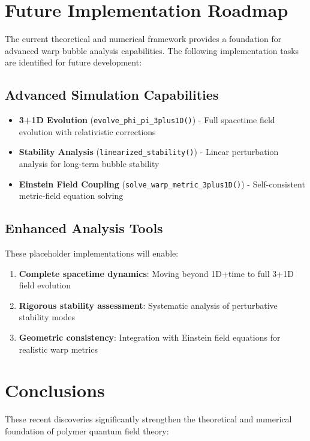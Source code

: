 \documentclass[11pt]{article}
\begin{document}
\section{Future Implementation Roadmap}

The current theoretical and numerical framework provides a foundation for advanced warp bubble analysis capabilities. The following implementation tasks are identified for future development:

\subsection{Advanced Simulation Capabilities}
\begin{itemize}
\item \textbf{3+1D Evolution} (\texttt{evolve\_phi\_pi\_3plus1D()}) - Full spacetime field evolution with relativistic corrections
\item \textbf{Stability Analysis} (\texttt{linearized\_stability()}) - Linear perturbation analysis for long-term bubble stability
\item \textbf{Einstein Field Coupling} (\texttt{solve\_warp\_metric\_3plus1D()}) - Self-consistent metric-field equation solving
\end{itemize}

\subsection{Enhanced Analysis Tools}
These placeholder implementations will enable:
\begin{enumerate}
\item \textbf{Complete spacetime dynamics}: Moving beyond 1D+time to full 3+1D field evolution
\item \textbf{Rigorous stability assessment}: Systematic analysis of perturbative stability modes
\item \textbf{Geometric consistency}: Integration with Einstein field equations for realistic warp metrics
\end{enumerate}

\section{Conclusions}

These recent discoveries significantly strengthen the theoretical and numerical foundation of polymer quantum field theory:
\end{document}
